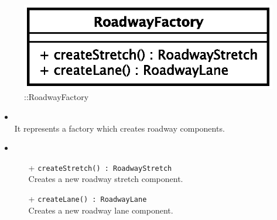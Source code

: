 \begin{figure}[h]
\centering
\includegraphics[scale=0.6,keepaspectratio]{images/solution/roadway_factory.eps}
\caption{\pReactiveFactory::RoadwayFactory}
\label{fig:sd-app-roadway-factory}
\end{figure}
\FloatBarrier
\begin{itemize}
  \item \textbf{\descr} \\
It represents a factory which creates roadway components.
  \item \textbf{\ops} \\
  \begin{itemize} 
    \item[+] \texttt{createStretch() : RoadwayStretch} \\
Creates a new roadway stretch component.
    \item[+] \texttt{createLane() : RoadwayLane} \\
Creates a new roadway lane component.
  \end{itemize}
\end{itemize}
